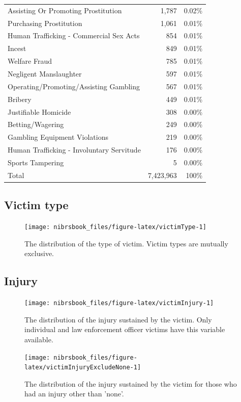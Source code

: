 \documentclass[
  12pt,
  openany]{book}
\begin{document}
\begin{longtable}[]{@{}lrr@{}}
Assisting Or Promoting Prostitution & 1,787 & 0.02\%\tabularnewline
Purchasing Prostitution & 1,061 & 0.01\%\tabularnewline
Human Trafficking - Commercial Sex Acts & 854 & 0.01\%\tabularnewline
Incest & 849 & 0.01\%\tabularnewline
Welfare Fraud & 785 & 0.01\%\tabularnewline
Negligent Manslaughter & 597 & 0.01\%\tabularnewline
Operating/Promoting/Assisting Gambling & 567 & 0.01\%\tabularnewline
Bribery & 449 & 0.01\%\tabularnewline
Justifiable Homicide & 308 & 0.00\%\tabularnewline
Betting/Wagering & 249 & 0.00\%\tabularnewline
Gambling Equipment Violations & 219 & 0.00\%\tabularnewline
Human Trafficking - Involuntary Servitude & 176 & 0.00\%\tabularnewline
Sports Tampering & 5 & 0.00\%\tabularnewline
Total & 7,423,963 & 100\%\tabularnewline
\bottomrule
\end{longtable}


\hypertarget{victim-type}{%
\subsection{Victim type}\label{victim-type}}

\begin{figure}

{\centering \texttt{[image: nibrsbook\_files/figure-latex/victimType-1]} 

}

\caption{The distribution of the type of victim. Victim types are mutually exclusive.}\label{fig:victimType}
\end{figure}

\hypertarget{injury}{%
\subsection{Injury}\label{injury}}

\begin{figure}

{\centering \texttt{[image: nibrsbook\_files/figure-latex/victimInjury-1]} 

}

\caption{The distribution of the injury sustained by the victim. Only individual and law enforcement officer victims have this variable available.}\label{fig:victimInjury}
\end{figure}

\begin{figure}

{\centering \texttt{[image: nibrsbook\_files/figure-latex/victimInjuryExcludeNone-1]} 

}

\caption{The distribution of the injury sustained by the victim for those who had an injury other than 'none'.}\label{fig:victimInjuryExcludeNone}
\end{figure}
\end{document}
